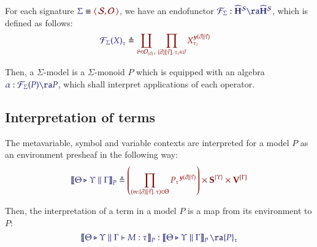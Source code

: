 \documentclass[11pt]{article}
\theoremstyle{definition}
\theoremstyle{remark}
\numberwithin{equation}{section}
\newcommand\HypCat{\mathbf{H}}
\begin{document}
For each signature $\Match{\Sigma}{\Pair{\Sorts}{\Operators}}$, we have an
endofunctor
$\Of{\SigFun{\Sigma}}{\widehat{\HypCat}^\Sorts\ra\widehat{\HypCat}^\Sorts}$,
which is defined as follows:
\begin{align*}
  \IMode{{\SigFun{\Sigma}(X)}_{\tau}}
&
    \triangleq
    \OMode{
      \coprod_{
        \vartheta\in \Operators_{\MkArity{\vec{v}}{\tau}}
      }
      \prod_{
        \MkValence
          {\vec{\sigma}}
          {\vec{\tau}}
          {\tau_i}
        \in\vec{v}
      }
      X_{\tau_i}^{\Yoneda{\vec{\sigma}\parallel\vec{\tau}}}
    }
\end{align*}

Then, a $\Sigma$-model is a $\Sigma$-monoid $P$ which is equipped with an
algebra $\Of{\alpha}{\SigFun{\Sigma}(P)\ra P}$, which shall interpret
applications of each operator.

\subsection{Interpretation of terms}

The metavariable, symbol and variable contexts are interpreted for a model $P$ as
an environment presheaf in the following way:
\[
  \Define{
    \SemBrackets{
      \Theta\triangleright\Upsilon\parallel\Gamma
    }_P
  }{
    \left(
      \prod_{
        (m:%
        \MkValence
          {\vec{\sigma}}
          {\vec{\tau}}
          {\tau})
        \in\Theta
      }{{P_{\tau}}^{\Yoneda{\vec{\sigma}\parallel\vec{\tau}}}}
    \right)
    \times
    \SymPsh^{\{\Upsilon\}}
    \times
    \VarPsh^{[\Gamma]}
  }
\]

Then, the interpretation of a term in a model $P$ is a map from its environment
to $P$:
\[
  \Of{
    \SemBrackets{
      \Theta\triangleright\Upsilon\parallel\Gamma\vdash M:\tau
    }_{P}
  }{
    \SemBrackets{
      \Theta\triangleright\Upsilon\parallel\Gamma
    }_{P}\ra {P}_{\tau}
  }
\]
\end{document}
